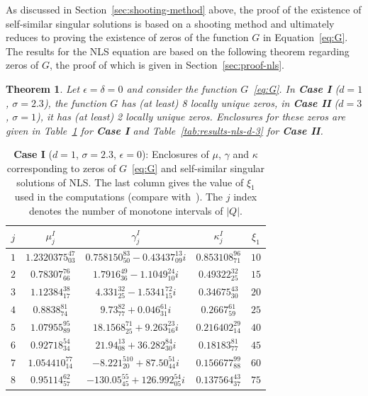 \documentclass[11pt]{article}
\newtheorem{theorem}[definition]{Theorem}
\begin{document}
As discussed in Section~\ref{sec:shooting-method} above, the proof of
the existence of self-similar singular solutions is based on a
shooting method and ultimately reduces to proving the existence of
zeros of the function \(G\) in Equation~\eqref{eq:G}. The results for
the NLS equation are based on the following theorem regarding zeros of
\(G\), the proof of which is given in Section~\ref{sec:proof-nls}.
\begin{theorem}
  \label{thm:G-nls}
  Let \(\epsilon = \delta = 0\) and consider the function
  \(G\)~\eqref{eq:G}. In \textbf{Case I} (\(d = 1\), \(\sigma = 2.3\)),
  the function \(G\) has (at least) 8 locally unique zeros, in
  \textbf{Case II} (\(d = 3\), \(\sigma = 1\)), it has (at least) 2
  locally unique zeros. Enclosures for these zeros are given in
  Table~\ref{tab:results-nls-d-1} for \textbf{Case I} and
  Table~\ref{tab:results-nls-d-3} for \textbf{Case II}.
\end{theorem}

\begin{table}[ht]
  \centering
  \begin{tabular}{ccccc}
    \toprule
    \(j\) & \(\mu_{j}^{I}\) & \(\gamma_{j}^{I}\) & \(\kappa_{j}^{I}\) & \(\xi_{1}\)\\
    \midrule
    \(1\) & \(1.2320375_{03}^{47}\) & \(0.758150_{50}^{83} - 0.43437_{09}^{13} i\) & \(0.853108_{71}^{96}\) & \(10\)\\
    \(2\) & \(0.78307_{66}^{76}\) & \(1.7916_{36}^{49} - 1.1049_{10}^{24} i\) & \(0.49322_{25}^{32}\) & \(15\)\\
    \(3\) & \(1.12384_{17}^{38}\) & \(4.331_{25}^{32} - 1.5341_{15}^{72} i\) & \(0.34675_{30}^{43}\) & \(20\)\\
    \(4\) & \(0.8838_{74}^{81}\) & \(9.73_{77}^{82} + 0.046_{31}^{61} i\) & \(0.2667_{59}^{61}\) & \(25\)\\
    \(5\) & \(1.07955_{89}^{95}\) & \(18.1568_{25}^{71} + 9.263_{16}^{23} i\) & \(0.216402_{14}^{29}\) & \(40\)\\
    \(6\) & \(0.92718_{34}^{54}\) & \(21.94_{08}^{13} + 36.282_{30}^{84} i\) & \(0.18183_{77}^{81}\) & \(45\)\\
    \(7\) & \(1.054410_{14}^{77}\) & \(-8.221_{20}^{510} + 87.50_{44}^{51} i\) & \(0.156677_{88}^{99}\) & \(60\)\\
    \(8\) & \(0.95114_{57}^{62}\) & \(-130.05_{45}^{55} + 126.992_{05}^{54} i\) & \(0.137564_{37}^{43}\) & \(75\)\\
    \bottomrule
  \end{tabular}
  \caption{\textbf{Case I} (\(d = 1\), \(\sigma = 2.3\),
    \(\epsilon = 0\)): Enclosures of \(\mu\), \(\gamma\) and
    \(\kappa\) corresponding to zeros of \(G\)~\eqref{eq:G} and
    self-similar singular solutions of NLS. The last column gives the
    value of \(\xi_{1}\) used in the computations (compare
    with~\cite[Table 3.2]{Plech2001}). The $j$ index denotes the number of monotone intervals of $|Q|$.}
  \label{tab:results-nls-d-1}
\end{table}
\end{document}
